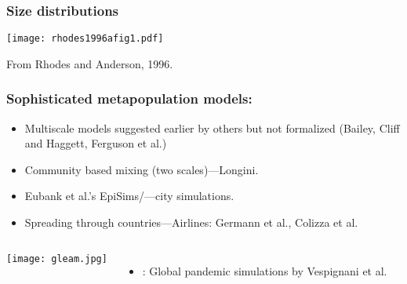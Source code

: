 \begin{frame}
  \frametitle{Size distributions}

  \texttt{[image: rhodes1996afig1.pdf]}

  From Rhodes and Anderson, 1996.
  
\end{frame}


\begin{frame}
  \frametitle{Sophisticated metapopulation models:}


  \begin{block}{}
    \begin{itemize}
    \item<1->  
      Multiscale models suggested earlier by others but not formalized
      (Bailey\cite{bailey1975a}, Cliff and Haggett\cite{cliff1981a}, Ferguson et al.)
    \item<1-> 
      Community based mixing (two scales)---Longini.\cite{longini1988a}
    \item<1-> 
      Eubank et al.'s 
      EpiSims/---city simulations.\cite{eubank2004a}
    \item<1-> 
      Spreading through countries---Airlines: Germann et al., Colizza et al.\cite{colizza2007a}
    \end{itemize}
    \begin{columns}
      \texttt{[image: gleam.jpg]}
      \begin{itemize}
      \item<1-> 
        : 
        Global pandemic simulations by Vespignani et al.
      \end{itemize}
    \end{columns}

  \end{block}

\end{frame}


